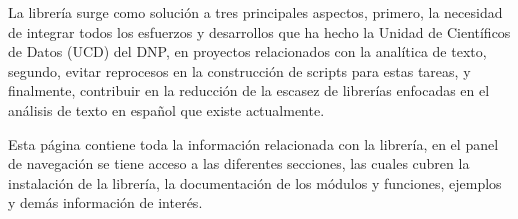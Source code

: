 \documentclass[letterpaper,10pt,openany,spanish]{sphinxmanual}
\begin{document}
La librería surge como solución a tres principales aspectos, primero, la necesidad de integrar todos los esfuerzos y desarrollos que ha hecho la Unidad de Científicos de Datos (UCD) del DNP, en proyectos relacionados con la analítica de texto, segundo, evitar reprocesos en la construcción de scripts para estas tareas, y finalmente, contribuir en la reducción de la escasez de librerías enfocadas en el análisis de texto en español que existe actualmente.

Esta página contiene toda la información relacionada con la librería, en el panel de navegación se tiene acceso a las diferentes secciones, las cuales cubren la instalación de la librería, la documentación de los módulos y funciones, ejemplos y demás información de interés.


\renewcommand{\indexname}{Índice de Módulos Python}
\begin{sphinxtheindex}
\let\bigletter\sphinxstyleindexlettergroup
\bigletter{c}
\item\relax{}
\item\relax{}
\indexspace
\bigletter{e}
\item\relax{}
\item\relax{}
\indexspace
\bigletter{l}
\item\relax{}
\item\relax{}
\item\relax{}
\item\relax{}
\indexspace
\bigletter{s}
\item\relax{}
\indexspace
\bigletter{u}
\item\relax{}
\item\relax{}
\indexspace
\bigletter{v}
\item\relax{}
\end{sphinxtheindex}

\renewcommand{\indexname}{Índice}
\printindex
\end{document}
